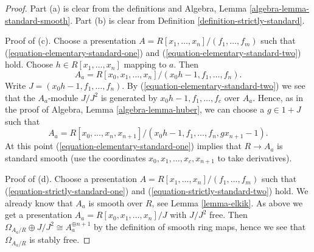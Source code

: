 \begin{proof}
Part (a) is clear from the definitions and
Algebra, Lemma \ref{algebra-lemma-standard-smooth}.
Part (b) is clear from Definition \ref{definition-strictly-standard}.

\medskip\noindent
Proof of (c). Choose a presentation
$A = R[x_1, \ldots, x_n]/(f_1, \ldots, f_m)$ such that
(\ref{equation-elementary-standard-one}) and
(\ref{equation-elementary-standard-two}) hold.
Choose $h \in R[x_1, \ldots, x_n]$ mapping to $a$. Then
$$
A_a = R[x_0, x_1, \ldots, x_n]/(x_0h - 1, f_1, \ldots, f_n).
$$
Write $J = (x_0h - 1, f_1, \ldots, f_n)$.
By (\ref{equation-elementary-standard-two}) we see that the $A_a$-module
$J/J^2$ is generated by $x_0h - 1, f_1, \ldots, f_c$
over $A_a$. Hence, as in the proof of Algebra, Lemma \ref{algebra-lemma-huber},
we can choose a $g \in 1 + J$ such that
$$
A_a = R[x_0, \ldots, x_n, x_{n + 1}]/
(x_0h - 1, f_1, \ldots, f_n, gx_{n + 1} - 1).
$$
At this point (\ref{equation-elementary-standard-one})
implies that $R \to A_a$ is standard smooth (use the coordinates
$x_0, x_1, \ldots, x_c, x_{n + 1}$ to take derivatives).

\medskip\noindent
Proof of (d). Choose a presentation
$A = R[x_1, \ldots, x_n]/(f_1, \ldots, f_m)$ such that
(\ref{equation-strictly-standard-one}) and
(\ref{equation-strictly-standard-two}) hold.
We already know that $A_a$ is smooth over $R$, see
Lemma \ref{lemma-elkik}. As above we get a presentation
$A_a = R[x_0, x_1, \ldots, x_n]/J$ with $J/J^2$ free.
Then $\Omega_{A_a/R} \oplus J/J^2 \cong A_a^{\oplus n + 1}$
by the definition of smooth ring maps, hence we see that $\Omega_{A_a/R}$
is stably free.


\end{proof}

